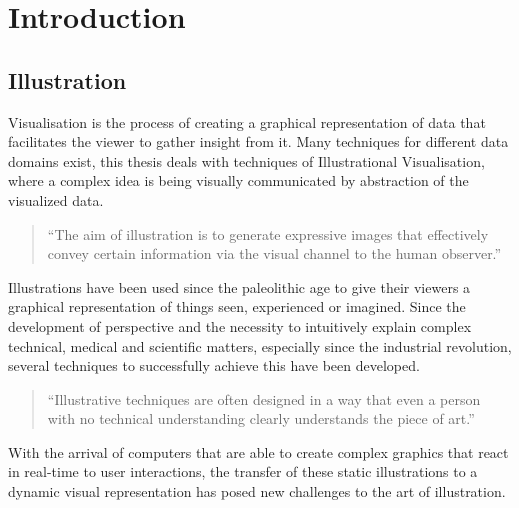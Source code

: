 \chapter{Introduction}
\section{Illustration}
Visualisation is the process of creating a graphical representation of data that facilitates the viewer to gather insight from it. Many techniques for different data domains exist, this thesis deals with techniques of Illustrational Visualisation, where a complex idea is being visually communicated by abstraction of the visualized data.
\begin{quote}
``The aim of illustration is to generate expressive images that effectively convey certain information via the visual channel to the human observer.'' \cite{Viola:2005:SVV:2381219.2381249}
\end{quote}
Illustrations have been used since the paleolithic age\cite{Viola:2005:SVV:2381219.2381249} to give their viewers a graphical representation of things seen, experienced or imagined. Since the development of perspective and the necessity to intuitively explain complex technical, medical and scientific matters, especially since the industrial revolution, several techniques to successfully achieve this have been developed.
\begin{quote}
``Illustrative techniques are often designed in a way that even a person with no technical understanding clearly understands the piece of art.'' \cite{Viola:2005:SVV:2381219.2381249}
\end{quote}
With the arrival of computers that are able to create complex graphics that react in real-time to user interactions, the transfer of these static illustrations to a dynamic visual representation has posed new challenges to the art of illustration.\\

